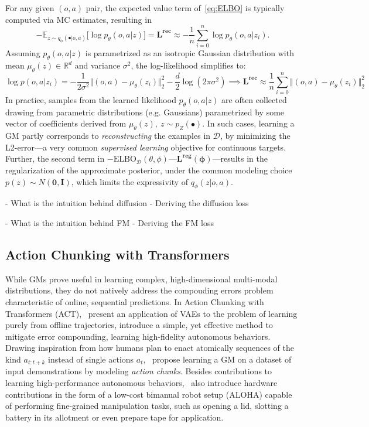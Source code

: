 For any given \((o,a) \) pair, the expected value term of~\ref{eq:ELBO} is typically computed via MC estimates, resulting in
\[ 
-\mathbb{E}_{z \sim q_\phi(\bullet \vert o,a)} \big[ \log p_\theta(o,a \vert z) \big] = \mathbf{L^{\text{rec}}} \approx - \frac{1}{n} \sum_{i=0}^n \log p_\theta(o,a \vert z_i).
\]
Assuming \( p_\theta(o,a \vert z) \) is parametrized as an isotropic Gaussian distribution with mean \(\mu_\theta (z) \in \mathbb R^d \) and variance \( \sigma^2 \), the log-likelihood simplifies to:
\[
\log p(o,a \vert z_i) = -\frac{1}{2\sigma^{2}} \big \Vert (o,a)-\mu_\theta(z_i) \big\Vert_2^2 -\frac{d}{2}\log(2\pi \sigma^{2}) \implies \mathbf{L^\text{rec}} \approx \frac {1}{n} \sum_{i=0}^n \big\Vert (o,a) - \mu_\theta(z_i) \big \Vert^2_2
\]
In practice, samples from the learned likelihood \( p_\theta(o,a \vert z) \) are often collected drawing from parametric distributions (e.g. Gaussians) parametrized by some vector of coefficients derived from \(\mu_\theta (z), \ z \sim p_Z (\bullet) \).
In such cases, learning a GM partly corresponds to \emph{reconstructing} the examples in \( \mathcal D \), by minimizing the L2-error---a very common \emph{supervised learning} objective for continuous targets.
Further, the second term in \( -\text{ELBO}_\mathcal D(\theta, \phi) \)---\( \mathbf{\mathbf{L^{\text{reg}}}(\phi)} \)---results in the regularization of the approximate posterior, under the common modeling choice \( p(z) \sim N(\mathbf{0}, \mathbf{I}) \), which limits the expressivity of \( q_\phi(z\vert o,a) \).

- What is the intuition behind diffusion
- Deriving the diffusion loss

- What is the intuition behind FM
- Deriving the FM loss

\subsection{Action Chunking with Transformers}
While GMs prove useful in learning complex, high-dimensional multi-modal distributions, they do not natively address the compouding errors problem characteristic of online, sequential predictions.
In Action Chunking with Transformers (ACT),~\citet{zhaoLearningFineGrainedBimanual2023} present an application of VAEs to the problem of learning purely from offline trajectories, introduce a simple, yet effective method to mitigate error compounding, learning high-fidelity autonomous behaviors.
Drawing inspiration from how humans plan to enact atomically sequences of the kind \( a_{t:t+k} \) instead of single actions \( a_t \),~\citet{zhaoLearningFineGrainedBimanual2023} propose learning a GM on a dataset of input demonstrations by modeling \emph{action chunks}.
Besides contributions to learning high-performance autonomous behaviors,~\citet{zhaoLearningFineGrainedBimanual2023} also introduce hardware contributions in the form of a low-cost bimanual robot setup (ALOHA) capable of performing fine-grained manipulation tasks, such as opening a lid, slotting a battery in its allotment or even prepare tape for application.


